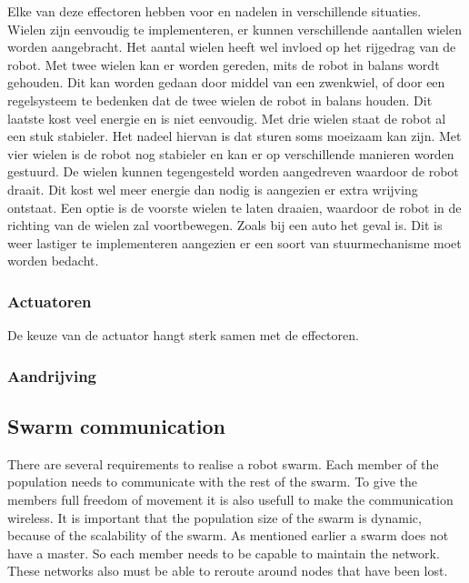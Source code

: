 \documentclass[10pt,a4paper]{article}
\begin{document}
  
Elke van deze effectoren hebben voor en nadelen in verschillende situaties.\\Wielen zijn eenvoudig te implementeren, er kunnen verschillende aantallen wielen worden aangebracht. Het aantal wielen heeft wel invloed op het rijgedrag van de robot. Met twee wielen kan er worden gereden, mits de robot in balans wordt gehouden. Dit kan worden gedaan door middel van een zwenkwiel, of door een regelsysteem te bedenken dat de twee wielen de robot in balans houden. Dit laatste kost veel energie en is niet eenvoudig. Met drie wielen staat de robot al een stuk stabieler. Het nadeel hiervan is dat sturen soms moeizaam kan zijn. Met vier wielen is de robot nog stabieler en kan er op verschillende manieren worden gestuurd. De wielen kunnen tegengesteld worden aangedreven waardoor de robot draait. Dit kost wel meer energie dan nodig is aangezien er extra wrijving ontstaat. Een optie is de voorste wielen te laten draaien, waardoor de robot in de richting van de wielen zal voortbewegen. Zoals bij een auto het geval is. Dit is weer lastiger te implementeren aangezien er een soort van stuurmechanisme moet worden bedacht. 

\subsubsection{Actuatoren}

De keuze van de actuator hangt sterk samen met de effectoren.

\subsubsection{Aandrijving}

\newpage
\subsection{Swarm communication}
There are several requirements to realise a robot swarm. Each member of the population needs to communicate with the rest of the swarm. To give the members full freedom of movement it is also usefull to make the communication wireless. It is important that the population size of the swarm is dynamic, because of the scalability of the swarm. As mentioned earlier a swarm does not have a master. So each member needs to be capable to maintain the network. These networks also must be able to reroute around nodes that have been lost. \cite{Swarmwiki}\cite{swarmintelligence}
\end{document}

